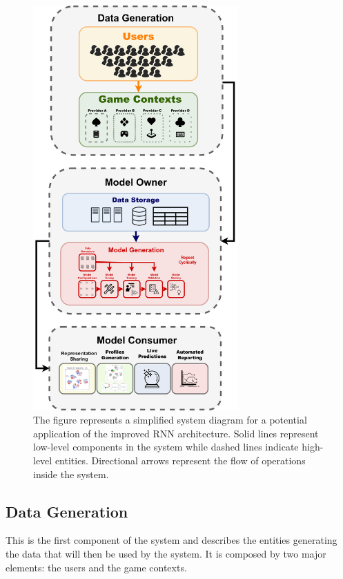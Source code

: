 \begin{figure}[ht]
\centering
\includegraphics[width=0.7\textwidth]{images/chapter_5/pipeline_diagram.png}
\caption[\textbf{Model Deployment Pipeline}]{The figure represents a simplified system diagram for a potential application of the improved RNN architecture. Solid lines represent low-level components in the system while dashed lines indicate high-level entities. Directional arrows represent the flow of operations inside the system.}
\label{pipeline}
\end{figure}

\subsection{Data Generation}
\label{data_generation}
This is the first component of the system and describes the entities generating the data that will then be used by the system. It is composed by two major elements: the users and the game contexts. 

